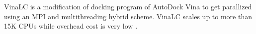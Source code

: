 VinaLC is a modification of docking program of AutoDock Vina to get parallized using an MPI and multithreading hybrid scheme. VinaLC scales up to more than 15K CPUs while overhead cost is very low \cite{Zhang_2013}. 
